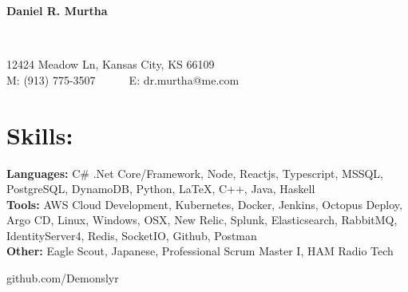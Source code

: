 \documentclass{res}
\begin{document}
\begin{resume}
\begin{changemargin}{-0.4in}{0in}
	\begin{center}
		\begin{Huge}
		\textbf{Daniel R. Murtha}
		\end{Huge}
	\\
		\begin{normalsize}
			12424 Meadow Ln, Kansas City, KS 66109\\
			M: (913) 775-3507~~~~~~E: dr.murtha@me.com
		\end{normalsize}
	\end{center}
\end{changemargin}\vspace{-15pt}
 \section{Skills:}\vspace{-5pt}
 \begin{minipage}{0.8\linewidth}
 	\begin{small}
 		\begin{flushleft}
 			{\bf Languages: }C\# .Net Core/Framework, Node, Reactjs, Typescript, MSSQL, PostgreSQL, DynamoDB, Python, LaTeX, C++, Java, Haskell\\
			{\bf Tools: }AWS Cloud Development, Kubernetes, Docker, Jenkins, Octopus Deploy, Argo CD, Linux, Windows, OSX, New Relic, Splunk, Elasticsearch, RabbitMQ, IdentityServer4, Redis, SocketIO, Github, Postman \\
			{\bf Other: } Eagle Scout, Japanese, Professional Scrum Master I, HAM Radio Tech
 		\end{flushleft}
 	\end{small}   
 \end{minipage}\vspace{-15pt}
 \begin{minipage}{0.2\linewidth}
 	\begin{small}   
		\begin{flushright}
			github.com/Demonslyr\\
		\end{flushright}     
 	\end{small}   
 \end{minipage}\vspace{-10pt}

\end{resume}
\end{document}

